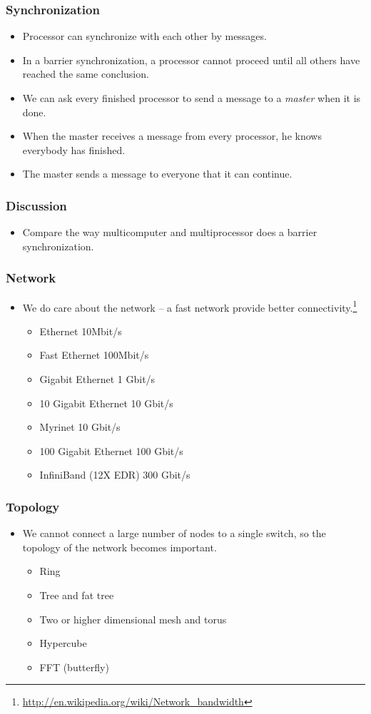 \documentclass{beamer}
\begin{document}
\begin{CJK}{UTF8}{bsmi}
\begin{frame}
\frametitle{Synchronization}
\begin{itemize}
\item Processor can synchronize with each other by messages.
\item In a barrier synchronization, a processor cannot proceed until
  all others have reached the same conclusion.
\item We can ask every finished processor to send a message to a {\em
  master} when it is done.
\item When the master receives a message from every processor, he
  knows everybody has finished.
\item The master sends a message to everyone that it can continue.
\end{itemize}
\end{frame}

\begin{frame}
\frametitle{Discussion}
\begin{itemize}
\item Compare the way multicomputer and multiprocessor does a barrier
 synchronization.
\end{itemize}
\end{frame}



\begin{frame}
\frametitle{Network}
\begin{itemize}
\item We do care about the network -- a fast network provide better
  connectivity.\footnote{\url{http://en.wikipedia.org/wiki/Network_bandwidth}}
\begin{itemize}
\item Ethernet 10Mbit/s
\item Fast Ethernet 100Mbit/s
\item Gigabit Ethernet 1 Gbit/s
\item 10 Gigabit Ethernet 10  Gbit/s
\item Myrinet 10 Gbit/s
\item 100 Gigabit Ethernet 100 Gbit/s
\item InfiniBand (12X EDR) 300 Gbit/s
\end{itemize}

\end{itemize}
\end{frame}

\begin{frame}
\frametitle{Topology}
\begin{itemize}
\item We cannot connect a large number of nodes to a single switch, so
  the topology of the network becomes important.
\begin{itemize}
\item Ring
\item Tree and fat tree
\item Two or higher dimensional mesh and torus
\item Hypercube
\item FFT (butterfly)
\end{itemize}
\end{itemize}
\end{frame}


\end{CJK}
\end{document}
